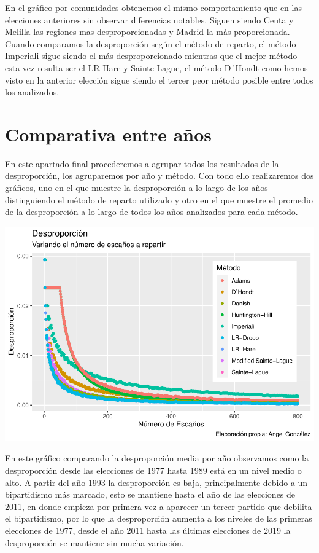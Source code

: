 \documentclass[12pt,a4paper,]{book}
\numberwithin{dummy}{section}
\theoremstyle{ocrenumbox}
\theoremstyle{blacknumex}
\theoremstyle{blacknumbox}
\theoremstyle{ocrenum}
\theoremstyle{ocrenum}
\begin{document}
En el gráfico por comunidades obtenemos el mismo comportamiento que en
las elecciones anteriores sin observar diferencias notables. Siguen
siendo Ceuta y Melilla las regiones mas desproporcionadas y Madrid la
más proporcionada.\\
Cuando comparamos la desproporción según el método de reparto, el método
Imperiali sigue siendo el más desproporcionado mientras que el mejor
método esta vez resulta ser el LR-Hare y Sainte-Lague, el método D´Hondt
como hemos visto en la anterior elección sigue siendo el tercer peor
método posible entre todos los analizados.

\hypertarget{comparativa-entre-auxf1os}{%
\section{Comparativa entre años}\label{comparativa-entre-auxf1os}}

En este apartado final procederemos a agrupar todos los resultados de la
desproporción, los agruparemos por año y método. Con todo ello
realizaremos dos gráficos, uno en el que muestre la desproporción a lo
largo de los años distinguiendo el método de reparto utilizado y otro en
el que muestre el promedio de la desproporción a lo largo de todos los
años analizados para cada método.

\begin{center}\includegraphics[width=1\linewidth]{figurasR/unnamed-chunk-49-1} \end{center}

En este gráfico comparando la desproporción media por año observamos
como la desproporción desde las elecciones de 1977 hasta 1989 está en un
nivel medio o alto. A partir del año 1993 la desproporción es baja,
principalmente debido a un bipartidismo más marcado, esto se mantiene
hasta el año de las elecciones de 2011, en donde empieza por primera vez
a aparecer un tercer partido que debilita el bipartidismo, por lo que la
desproporción aumenta a los niveles de las primeras elecciones de 1977,
desde el año 2011 hasta las últimas elecciones de 2019 la desproporción
se mantiene sin mucha variación.
\end{document}
